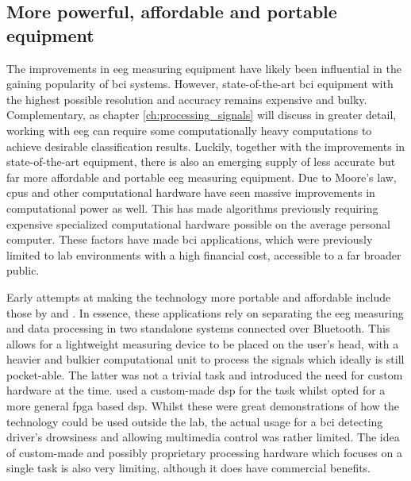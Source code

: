 
\subsection{More powerful, affordable and portable equipment}
\label{subsec:bci_gaining_popularity_better_processing}

The improvements in \gls{eeg} measuring equipment have likely been influential in the gaining popularity of \gls{bci} systems.
However, state-of-the-art \gls{bci} equipment with the highest possible resolution and accuracy remains expensive and bulky.
Complementary, as chapter \ref{ch:processing_signals} will discuss in greater detail,  working with \gls{eeg} can require some computationally heavy computations to achieve desirable classification results.
Luckily, together with the improvements in state-of-the-art equipment, there is also an emerging supply of less accurate but far more affordable and portable \gls{eeg} measuring equipment.
Due to Moore's law, \glspl{cpu} and other computational hardware have seen massive improvements in computational power as well.
This has made algorithms previously requiring expensive specialized computational hardware possible on the average personal computer.
These factors have made \gls{bci} applications, which were previously limited to lab environments with a high financial cost, accessible to a far broader public.

Early attempts at making the technology more portable and affordable include those by \citet{early_bci_drowsiness} and \citet{early_bci_multimedia}.
In essence, these applications rely on separating the \gls{eeg} measuring and data processing in two standalone systems connected over Bluetooth.
This allows for a lightweight measuring device to be placed on the user's head, with a heavier and bulkier computational unit to process the signals which ideally is still pocket-able.
The latter was not a trivial task and introduced the need for custom hardware at the time.
\citet{early_bci_drowsiness} used a custom-made \gls{dsp} for the task whilst \citet{early_bci_multimedia} opted for a more general \gls{fpga} based \gls{dsp}.
Whilst these were great demonstrations of how the technology could be used outside the lab, the actual usage for a bci detecting driver's drowsiness \citep{early_bci_drowsiness} and allowing multimedia control \citep{early_bci_multimedia} was rather limited.
The idea of custom-made and possibly proprietary processing hardware which focuses on a single task is also very limiting, although it does have commercial benefits.

